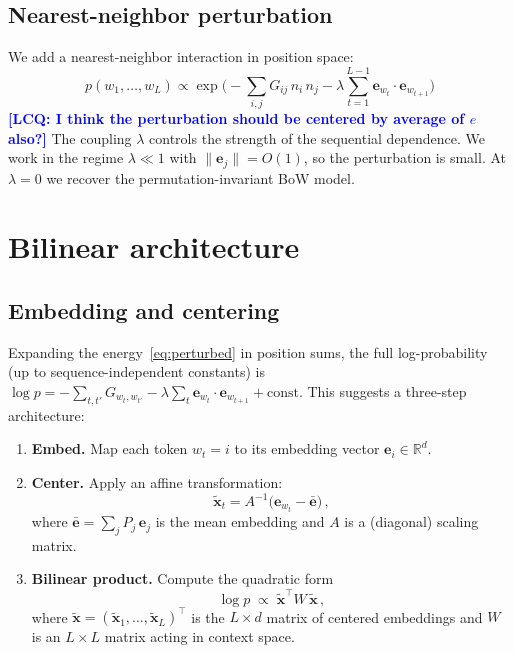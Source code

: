 \documentclass[11pt]{article}
\newcommand{\ee}{\bm{e}}
\newcommand{\lcq}[1]{\textcolor{blue}{\textbf{[LCQ: #1]}}}
\begin{document}
\subsection{Nearest-neighbor perturbation}

We add a nearest-neighbor interaction in position space:
\begin{equation}\label{eq:perturbed}
    \boxed{\;p(w_1, \ldots, w_L) \propto \exp\!\Big(-\sum_{i,j} G_{ij}\, n_i\, n_j - \lambda \sum_{t=1}^{L-1} \ee_{w_t} \cdot \ee_{w_{t+1}}\Big)\;}
\end{equation}
\lcq{I think the perturbation should be centered by average of $e$ also?}
The coupling $\lambda$ controls the strength of the sequential dependence. We work in the regime $\lambda \ll 1$ with $\|\ee_j\| = O(1)$, so the perturbation is small. At $\lambda = 0$ we recover the permutation-invariant BoW model.

\section{Bilinear architecture}\label{sec:arch}

\subsection{Embedding and centering}

Expanding the energy~\eqref{eq:perturbed} in position sums, the full log-probability (up to sequence-independent constants) is $\log p = -\sum_{t,t'} G_{w_t, w_{t'}} - \lambda \sum_{t} \ee_{w_t} \cdot \ee_{w_{t+1}} + \text{const}$. This suggests a three-step architecture:
\begin{enumerate}
    \item \textbf{Embed.} Map each token $w_t = i$ to its embedding vector $\ee_i \in \mathbb{R}^d$.
    \item \textbf{Center.} Apply an affine transformation:
    \begin{equation}\label{eq:center}
        \tilde{\bm{x}}_t = A^{-1}\big(\ee_{w_t} - \bar{\ee}\big)\,,
    \end{equation}
    where $\bar{\ee} = \sum_j P_j\, \ee_j$ is the mean embedding and $A$ is a (diagonal) scaling matrix.
    \item \textbf{Bilinear product.} Compute the quadratic form
    \begin{equation}\label{eq:bilinear}
        \log p \;\propto\; \tilde{\bm{x}}^\top W\, \tilde{\bm{x}}\,,
    \end{equation}
    where $\tilde{\bm{x}} = (\tilde{\bm{x}}_1, \ldots, \tilde{\bm{x}}_L)^\top$ is the $L \times d$ matrix of centered embeddings and $W$ is an $L \times L$ matrix acting in context space.
\end{enumerate}
\end{document}
